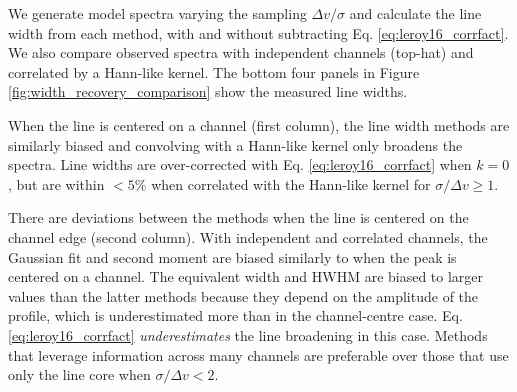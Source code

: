 \documentclass{rnaastex}
\begin{document}


We generate model spectra varying the sampling $\Delta v / \sigma$ and calculate the line width from each method, with and without subtracting Eq. \ref{eq:leroy16_corrfact}. We also compare observed spectra with independent channels (top-hat) and correlated by a Hann-like kernel. The bottom four panels in Figure \ref{fig:width_recovery_comparison} show the measured line widths.

When the line is centered on a channel (first column), the line width methods are similarly biased and convolving with a Hann-like kernel only broadens the spectra.  Line widths are over-corrected with Eq. \ref{eq:leroy16_corrfact} when $k=0$, but are within $<5\%$ when correlated with the Hann-like kernel for $\sigma/\Delta v \geq 1$.

There are deviations between the methods when the line is centered on the channel edge (second column). With independent and correlated channels, the Gaussian fit and second moment are biased similarly to when the peak is centered on a channel.  The equivalent width and HWHM are biased to larger values than the latter methods because they depend on the amplitude of the profile, which is underestimated more than in the channel-centre case. Eq. \ref{eq:leroy16_corrfact} {\it underestimates} the line broadening in this case. Methods that leverage information across many channels are preferable over those that use only the line core when $\sigma / \Delta v < 2$. 

\end{document}
